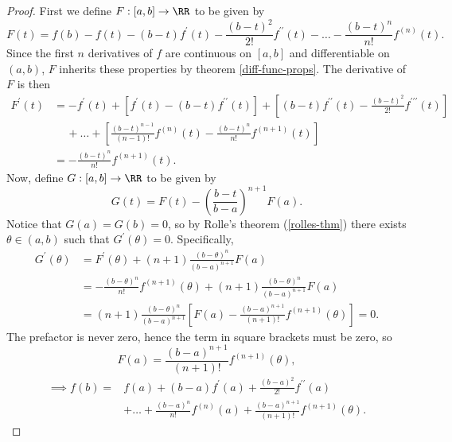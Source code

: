 \documentclass[../real_analysis.tex]{subfiles}
\begin{document}
        \begin{proof}
            First we define $F:[a,b]\to\RR$ to be given by
            \begin{equation}
                F(t)=f(b)-f(t)-(b-t)f^\prime(t)-\frac{(b-t)^2}{2!}f^{\prime\prime}(t)-\dots-\frac{(b-t)^n}{n!}f^{(n)}(t).
            \end{equation}
            Since the first $n$ derivatives of $f$ are continuous on $[a,b]$ and differentiable on $(a,b)$, $F$ inherits these properties by theorem \ref{diff-func-props}. The derivative of $F$ is then
            \begin{align}
                F^\prime(t)&=-f^\prime(t)+[f^\prime(t)-(b-t)f^{\prime\prime}(t)]+\left[(b-t)f^{\prime\prime}(t)-\frac{(b-t)^2}{2!}f^{\prime\prime\prime}(t)\right]\\
                &\quad\,+\dots+\left[\frac{(b-t)^{n-1}}{(n-1)!}f^{(n)}(t)-\frac{(b-t)^n}{n!}f^{(n+1)}(t)\right]\\
                &=-\frac{(b-t)^n}{n!}f^{(n+1)}(t).
            \end{align}
            Now, define $G:[a,b]\to\RR$ to be given by
            \begin{equation}
                G(t)=F(t)-\left(\frac{b-t}{b-a}\right)^{n+1}F(a).
            \end{equation}
            Notice that $G(a)=G(b)=0$, so by Rolle's theorem (\ref{rolles-thm}) there exists $\theta\in(a,b)$ such that $G^\prime(\theta)=0$. Specifically,
            \begin{align}
                G^\prime(\theta)&=F^\prime(\theta)+(n+1)\frac{(b-\theta)^n}{(b-a)^{n+1}}F(a)\\
                &=-\frac{(b-\theta)^n}{n!}f^{(n+1)}(\theta)+(n+1)\frac{(b-\theta)^n}{(b-a)^{n+1}}F(a)\\
                &=(n+1)\frac{(b-\theta)^n}{(b-a)^{n+1}}\left[F(a)-\frac{(b-a)^{n+1}}{(n+1)!}f^{(n+1)}(\theta)\right]=0.
            \end{align}
            The prefactor is never zero, hence the term in square brackets must be zero, so
            \begin{equation}
                F(a)=\frac{(b-a)^{n+1}}{(n+1)!}f^{(n+1)}(\theta),
            \end{equation}
            \begin{align}
                \implies f(b)=&f(a)+(b-a)f^\prime(a)+\frac{(b-a)^2}{2!}f^{\prime\prime}(a)\\
                &+\dots+\frac{(b-a)^n}{n!}f^{(n)}(a)+\frac{(b-a)^{n+1}}{(n+1)!}f^{(n+1)}(\theta).
            \end{align}
        \end{proof}
\end{document}
